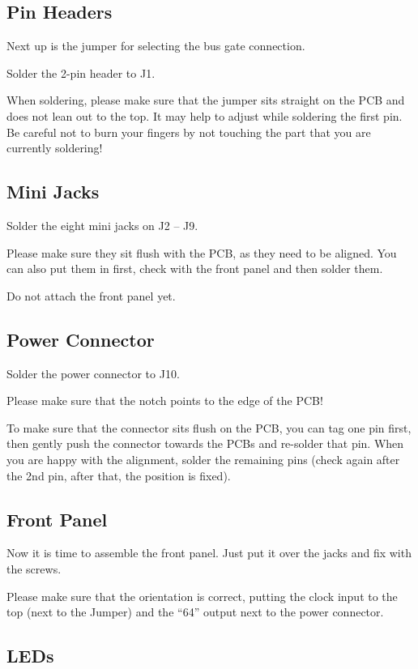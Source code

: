 \documentclass[a4paper,
               11pt,
               parskip=half,
               headinclude,
               titlepage=false]{scrartcl}
\begin{document}
\subsection*{Pin Headers}

Next up is the jumper for selecting the bus gate connection.

Solder the 2-pin header to J1.

When soldering, please make sure that the jumper sits straight on the PCB and does not lean out to the top. It may help to adjust while soldering the first pin. Be careful not to burn your fingers by not touching the part that you are currently soldering!


\subsection*{Mini Jacks}

Solder the eight mini jacks on J2 -- J9.

Please make sure they sit flush with the PCB, as they need to be aligned.
You can also put them in first, check with the front panel and then solder them.

Do not attach the front panel yet.


\subsection*{Power Connector}

Solder the power connector to J10.

Please make sure that the notch points to the edge of the PCB!

To make sure that the connector sits flush on the PCB, you can tag one pin first, then gently push the connector towards the PCBs and re-solder that pin. When you are happy with the alignment, solder the remaining pins (check again after the 2nd pin, after that, the position is fixed).


\subsection*{Front Panel}

Now it is time to assemble the front panel.
Just put it over the jacks and fix with the screws.

Please make sure that the orientation is correct, putting the clock input to the top (next to the Jumper) and the \enquote{64} output next to the power connector.


\subsection*{LEDs}
\end{document}
